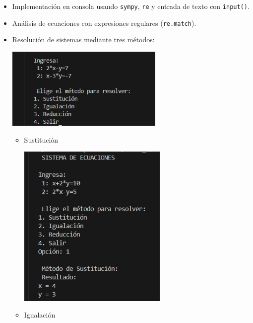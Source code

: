 \documentclass[a4paper,10pt]{article}
\begin{document}
\begin{itemize}
    \item Implementación en consola usando \texttt{sympy}, \texttt{re} y entrada de texto con \texttt{input()}.
    \item Análisis de ecuaciones con expresiones regulares (\texttt{re.match}).
    \item Resolución de sistemas mediante tres métodos:


\begin{center}
    \includegraphics[width=0.6\textwidth]{imagen_metodos.png} 
\end{center}
    
    \begin{itemize}
        \item Sustitución
        
        \begin{center}
            \includegraphics[width=0.6\textwidth]{sustitucion.png}
        \end{center}
        
        \item Igualación
        

\end{itemize}
\end{itemize}
\end{document}
